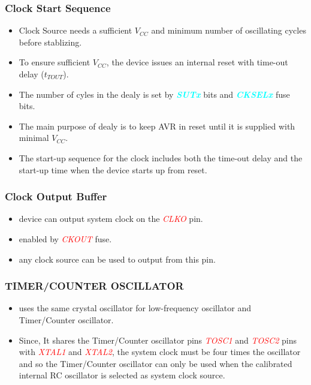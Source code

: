 \documentclass{article}
\newcommand{\bitFormat}[1]{\emph{\textbf{\textcolor{cyan}{#1}}}}
\newcommand{\pinFormat}[1]{\emph{\textcolor{red}{#1}}}
\begin{document}
\subsubsection*{Clock Start Sequence}
\begin{itemize}
    \item Clock Source needs a sufficient $V_{CC}$ and minimum number of oscillating cycles before stablizing.
    \item To ensure sufficient $V_{CC}$, the device issues an internal reset with time-out delay ($t_{TOUT}$).
    \item The number of cyles in the dealy is set by \bitFormat{SUTx} bits and \bitFormat{CKSELx} fuse bits.
    \item The main purpose of dealy is to keep AVR in reset until it is supplied with minimal $V_{CC}$.
    \item The start-up sequence for the clock includes both the time-out delay and the start-up time when the device starts up from
    reset.
\end{itemize}

\subsubsection*{Clock Output Buffer}
\begin{itemize}
    \item device can output system clock on the \pinFormat{CLKO} pin.
    \item enabled by \pinFormat{CKOUT} fuse.
    \item any clock source can be used to output from this pin.
\end{itemize}

\subsubsection*{TIMER/COUNTER OSCILLATOR}
\begin{itemize}
    \item uses the same crystal oscillator for low-frequency oscillator and Timer/Counter oscillator.
    \item Since, It shares the Timer/Counter oscillator pins  \pinFormat{TOSC1} and \pinFormat{TOSC2} pins with \pinFormat{XTAL1} and \pinFormat{XTAL2}, the system clock must be four times the oscillator and so the Timer/Counter oscillator can only be used when the calibrated internal RC oscillator is selected as system clock source.
\end{itemize}
\end{document}
